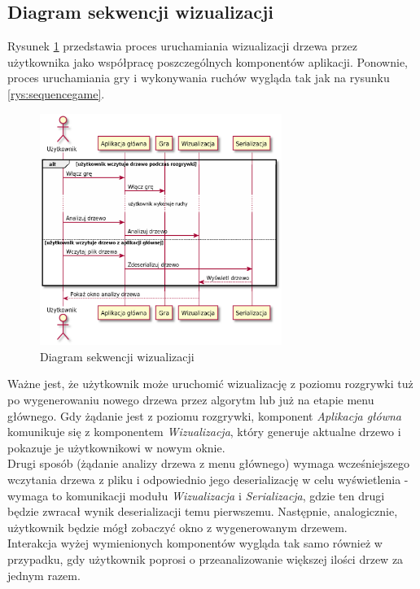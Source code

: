 \documentclass{article}
\newcommand{\modulename}[1]{\textit{#1}}
\begin{document}
\subsection{Diagram sekwencji wizualizacji}
Rysunek \ref{rys:sequencevisualise} przedstawia proces uruchamiania wizualizacji drzewa przez użytkownika jako współpracę poszczególnych komponentów aplikacji. Ponownie, proces uruchamiania gry i wykonywania ruchów wygląda tak jak na rysunku \ref{rys:sequencegame}. 
\begin{figure}[h]
	\centering
	\includegraphics[width=0.7\textwidth]{visualization_sequence_simplified}
	\caption{Diagram sekwencji wizualizacji}
	\label{rys:sequencevisualise}
\end{figure}

\noindent Ważne jest, że użytkownik może uruchomić wizualizację z poziomu rozgrywki tuż po wygenerowaniu nowego drzewa przez algorytm lub już na etapie menu głównego. Gdy żądanie jest z poziomu rozgrywki, komponent \modulename{Aplikacja główna} komunikuje się z komponentem \modulename{Wizualizacja}, który generuje aktualne drzewo i pokazuje je użytkownikowi w nowym oknie. \\

\noindent Drugi sposób (żądanie analizy drzewa z menu głównego) wymaga wcześniejszego wczytania drzewa z pliku i odpowiednio jego deserializację w celu wyświetlenia - wymaga to komunikacji modułu \modulename{Wizualizacja} i \modulename{Serializacja}, gdzie ten drugi będzie zwracał wynik deserializacji temu pierwszemu. Następnie, analogicznie, użytkownik będzie mógł zobaczyć okno z wygenerowanym drzewem.\\

\noindent Interakcja wyżej wymienionych komponentów wygląda tak samo również w przypadku, gdy użytkownik poprosi o przeanalizowanie większej ilości drzew za jednym razem.
\end{document}
